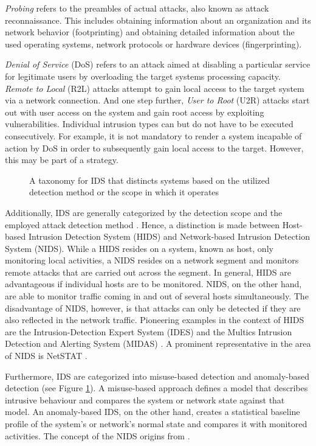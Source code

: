 \textit{Probing} refers to the preambles of actual attacks, also known as attack reconnaissance. This includes obtaining information about an organization and its network behavior (footprinting) and obtaining detailed information about the used operating systems, network protocols or hardware devices (fingerprinting). 

\textit{Denial of Service} (DoS) refers to an attack aimed at disabling a particular service for legitimate users by overloading the target systems processing capacity. \textit{Remote to Local} (R2L) attacks attempt to gain local access to the target system via a network connection. And one step further, \textit{User to Root} (U2R) attacks start out with user access on the system and gain root access by exploiting vulnerabilities. Individual intrusion types can but do not have to be executed consecutively. For example, it is not mandatory to render a system incapable of action by DoS in order to subsequently gain local access to the target. However, this may be part of a strategy.

\begin{figure}[b]
    \centering
    
    \caption{A taxonomy for IDS that distincts systems based on the utilized detection method or the  scope in which it operates}
    \label{fig:ids-taxonomy}
\end{figure}

Additionally, IDS are generally categorized by the detection scope and the employed attack detection method \cite{milenkoski2015evaluating}. Hence, a distinction is made between Host-based Intrusion Detection System (HIDS) and Network-based Intrusion Detection System (NIDS). While a HIDS resides on a system, known as host, only monitoring local activities, a NIDS resides on a network segment and monitors remote attacks that are carried out across the segment. In general, HIDS are advantageous if individual hosts are to be monitored. NIDS, on the other hand, are able to monitor traffic coming in and out of several hosts simultaneously. The disadvantage of NIDS, however, is that attacks can only be detected if they are also reflected in the network traffic. Pioneering examples in the context of HIDS are the Intrusion-Detection Expert System (IDES) \cite{lunt1992real} and the Multics Intrusion Detection and Alerting System (MIDAS) \cite{sebring1988expert}. A prominent representative in the area of NIDS is NetSTAT \cite{vigna1998netstat} \cite{vigna1999netstat}.

Furthermore, IDS are categorized into misuse-based detection and anomaly-based detection (see Figure \ref{fig:ids-taxonomy}). A misuse-based approach defines a model that describes intrusive behaviour and compares the system or network state against that model. An anomaly-based IDS, on the other hand, creates a statistical baseline profile of the system’s or network’s normal state and compares it with monitored activities. The concept of the NIDS origins from \cite{denning1987intrusion}. 


